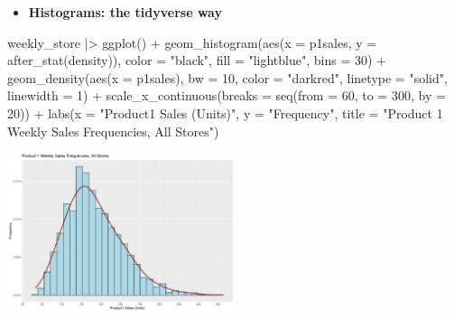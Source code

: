 \documentclass[
  ignorenonframetext,
]{beamer}
\newenvironment{Shaded}{\begin{snugshade}}{\end{snugshade}}
\newcommand{\AttributeTok}[1]{\textcolor[rgb]{0.40,0.45,0.13}{#1}}
\newcommand{\DecValTok}[1]{\textcolor[rgb]{0.68,0.00,0.00}{#1}}
\newcommand{\FunctionTok}[1]{\textcolor[rgb]{0.28,0.35,0.67}{#1}}
\newcommand{\NormalTok}[1]{\textcolor[rgb]{0.00,0.23,0.31}{#1}}
\newcommand{\SpecialCharTok}[1]{\textcolor[rgb]{0.37,0.37,0.37}{#1}}
\newcommand{\StringTok}[1]{\textcolor[rgb]{0.13,0.47,0.30}{#1}}
\providecommand{\tightlist}{%
  \setlength{\itemsep}{0pt}\setlength{\parskip}{0pt}}\usepackage{longtable,booktabs,array}
\begin{document}
\begin{frame}[fragile]{}
\label{section-21}
\begin{itemize}
\tightlist
\item
  \textbf{Histograms: the tidyverse way}
\end{itemize}

\tiny

\begin{Shaded}
\begin{Highlighting}[]
\NormalTok{weekly\_store }\SpecialCharTok{|\textgreater{}} \FunctionTok{ggplot}\NormalTok{() }\SpecialCharTok{+} 
  \FunctionTok{geom\_histogram}\NormalTok{(}\FunctionTok{aes}\NormalTok{(}\AttributeTok{x =}\NormalTok{ p1sales, }\AttributeTok{y =} \FunctionTok{after\_stat}\NormalTok{(density)),}
                 \AttributeTok{color =} \StringTok{"black"}\NormalTok{, }\AttributeTok{fill =} \StringTok{"lightblue"}\NormalTok{, }\AttributeTok{bins =} \DecValTok{30}\NormalTok{) }\SpecialCharTok{+}
  \FunctionTok{geom\_density}\NormalTok{(}\FunctionTok{aes}\NormalTok{(}\AttributeTok{x =}\NormalTok{ p1sales),}
               \AttributeTok{bw =} \DecValTok{10}\NormalTok{, }\AttributeTok{color =} \StringTok{"darkred"}\NormalTok{, }\AttributeTok{linetype =} \StringTok{"solid"}\NormalTok{, }\AttributeTok{linewidth =} \DecValTok{1}\NormalTok{) }\SpecialCharTok{+} 
  \FunctionTok{scale\_x\_continuous}\NormalTok{(}\AttributeTok{breaks =} \FunctionTok{seq}\NormalTok{(}\AttributeTok{from =} \DecValTok{60}\NormalTok{, }\AttributeTok{to =} \DecValTok{300}\NormalTok{, }\AttributeTok{by =} \DecValTok{20}\NormalTok{)) }\SpecialCharTok{+}
  \FunctionTok{labs}\NormalTok{(}\AttributeTok{x =} \StringTok{"Product1 Sales (Units)"}\NormalTok{, }\AttributeTok{y =} \StringTok{"Frequency"}\NormalTok{, }
       \AttributeTok{title =} \StringTok{"Product 1 Weekly Sales Frequencies, All Stores"}\NormalTok{)}
\end{Highlighting}
\end{Shaded}

\begin{center}
\includegraphics[width=0.5\textwidth,height=\textheight]{003_describing_data_files/figure-beamer/unnamed-chunk-20-1.pdf}
\end{center}
\end{frame}
\end{document}
